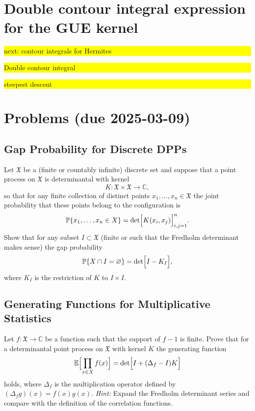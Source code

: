 \documentclass[letterpaper,11pt,oneside,reqno]{article}
\numberwithin{equation}{section}
\theoremstyle{definition}
\begin{document}
\section{Double contour integral expression for the GUE kernel}

\colorbox{yellow}{\parbox{.7\textwidth}{next: contour integrals for Hermites}}

\colorbox{yellow}{\parbox{.7\textwidth}{Double contour integral}}

\colorbox{yellow}{\parbox{.7\textwidth}{steepest descent}}





























\appendix
\setcounter{section}{4}

\section{Problems (due 2025-03-09)}


\subsection{Gap Probability for Discrete DPPs}
Let \(\mathfrak{X}\) be a (finite or countably infinite) discrete set and suppose that a point process on \(\mathfrak{X}\) is determinantal with kernel 
\[
K : \mathfrak{X}\times\mathfrak{X}\to\mathbb{C},
\]
so that for any finite collection of distinct points \(x_1,\dots,x_n\in \mathfrak{X}\) the joint probability that these points belong to the configuration is
\[
\mathbb{P}\{x_1,\dots,x_n\in X\}=\det\Bigl[K(x_i,x_j)\Bigr]_{i,j=1}^n.
\]
Show that for any subset \(I\subset\mathfrak{X}\) (finite or such that the Fredholm determinant makes sense) the gap probability
\[
\mathbb{P}\{X\cap I=\varnothing\}=\det\Bigl[I-K_I\Bigr],
\]
where \(K_I\) is the restriction of \(K\) to \(I\times I\).  


\subsection{Generating Functions for Multiplicative Statistics}
Let \(f:\mathfrak{X}\to\mathbb{C}\) be a function such that the support of \(f-1\) is finite. Prove that for a determinantal point process on \(\mathfrak{X}\) with kernel \(K\) the generating function
\[
\mathbb{E}\Bigl[\prod_{x\in X} f(x)\Bigr] = \det\Bigl[I+(\Delta_f-I)K\Bigr]
\]
holds, where \(\Delta_f\) is the multiplication operator defined by \((\Delta_f g)(x)=f(x)g(x)\).  
\emph{Hint:} Expand the Fredholm determinant series and compare with the definition of the correlation functions.
\end{document}
